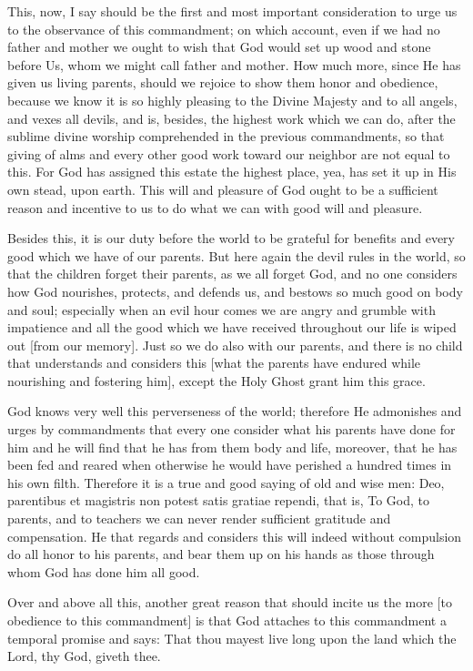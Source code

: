 This, now, I say should be the first and most important consideration
to urge us to the observance of this commandment; on which account,
even if we had no father and mother we ought to wish that God would set
up wood and stone before Us, whom we might call father and mother. How
much more, since He has given us living parents, should we rejoice to
show them honor and obedience, because we know it is so highly pleasing
to the Divine Majesty and to all angels, and vexes all devils, and is,
besides, the highest work which we can do, after the sublime divine
worship comprehended in the previous commandments, so that giving of
alms and every other good work toward our neighbor are not equal to
this. For God has assigned this estate the highest place, yea, has set
it up in His own stead, upon earth. This will and pleasure of God ought
to be a sufficient reason and incentive to us to do what we can with
good will and pleasure.

Besides this, it is our duty before the world to be grateful for
benefits and every good which we have of our parents. But here again
the devil rules in the world, so that the children forget their
parents, as we all forget God, and no one considers how God nourishes,
protects, and defends us, and bestows so much good on body and soul;
especially when an evil hour comes we are angry and grumble with
impatience and all the good which we have received throughout our life
is wiped out [from our memory]. Just so we do also with our parents,
and there is no child that understands and considers this [what the
parents have endured while nourishing and fostering him], except the
Holy Ghost grant him this grace.

God knows very well this perverseness of the world; therefore He
admonishes and urges by commandments that every one consider what his
parents have done for him and he will find that he has from them body
and life, moreover, that he has been fed and reared when otherwise he
would have perished a hundred times in his own filth. Therefore it is a
true and good saying of old and wise men: Deo, parentibus et magistris
non potest satis gratiae rependi, that is, To God, to parents, and to
teachers we can never render sufficient gratitude and compensation. He
that regards and considers this will indeed without compulsion do all
honor to his parents, and bear them up on his hands as those through
whom God has done him all good.

Over and above all this, another great reason that should incite us the
more [to obedience to this commandment] is that God attaches to this
commandment a temporal promise and says: That thou mayest live long
upon the land which the Lord, thy God, giveth thee.

